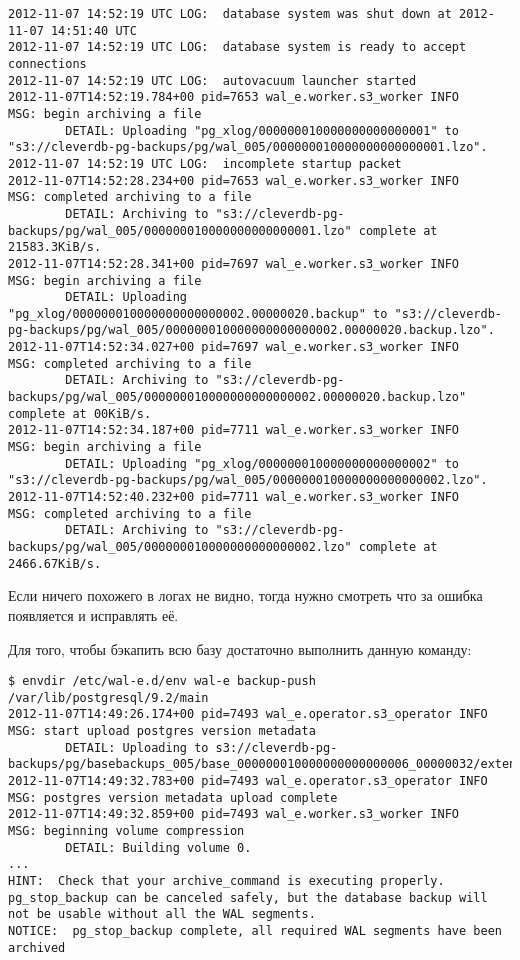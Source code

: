 \begin{lstlisting}[label=lst:wal-e8,caption=Логи PostgreSQL]
2012-11-07 14:52:19 UTC LOG:  database system was shut down at 2012-11-07 14:51:40 UTC
2012-11-07 14:52:19 UTC LOG:  database system is ready to accept connections
2012-11-07 14:52:19 UTC LOG:  autovacuum launcher started
2012-11-07T14:52:19.784+00 pid=7653 wal_e.worker.s3_worker INFO     MSG: begin archiving a file
        DETAIL: Uploading "pg_xlog/000000010000000000000001" to "s3://cleverdb-pg-backups/pg/wal_005/000000010000000000000001.lzo".
2012-11-07 14:52:19 UTC LOG:  incomplete startup packet
2012-11-07T14:52:28.234+00 pid=7653 wal_e.worker.s3_worker INFO     MSG: completed archiving to a file
        DETAIL: Archiving to "s3://cleverdb-pg-backups/pg/wal_005/000000010000000000000001.lzo" complete at 21583.3KiB/s.
2012-11-07T14:52:28.341+00 pid=7697 wal_e.worker.s3_worker INFO     MSG: begin archiving a file
        DETAIL: Uploading "pg_xlog/000000010000000000000002.00000020.backup" to "s3://cleverdb-pg-backups/pg/wal_005/000000010000000000000002.00000020.backup.lzo".
2012-11-07T14:52:34.027+00 pid=7697 wal_e.worker.s3_worker INFO     MSG: completed archiving to a file
        DETAIL: Archiving to "s3://cleverdb-pg-backups/pg/wal_005/000000010000000000000002.00000020.backup.lzo" complete at 00KiB/s.
2012-11-07T14:52:34.187+00 pid=7711 wal_e.worker.s3_worker INFO     MSG: begin archiving a file
        DETAIL: Uploading "pg_xlog/000000010000000000000002" to "s3://cleverdb-pg-backups/pg/wal_005/000000010000000000000002.lzo".
2012-11-07T14:52:40.232+00 pid=7711 wal_e.worker.s3_worker INFO     MSG: completed archiving to a file
        DETAIL: Archiving to "s3://cleverdb-pg-backups/pg/wal_005/000000010000000000000002.lzo" complete at 2466.67KiB/s.
\end{lstlisting}

Если ничего похожего в логах не видно, тогда нужно смотреть что за ошибка появляется и исправлять её.

Для того, чтобы бэкапить всю базу достаточно выполнить данную команду:

\begin{lstlisting}[label=lst:wal-e9,caption=Загрузка бэкапа всей базы данных в S3]
$ envdir /etc/wal-e.d/env wal-e backup-push /var/lib/postgresql/9.2/main
2012-11-07T14:49:26.174+00 pid=7493 wal_e.operator.s3_operator INFO     MSG: start upload postgres version metadata
        DETAIL: Uploading to s3://cleverdb-pg-backups/pg/basebackups_005/base_000000010000000000000006_00000032/extended_version.txt.
2012-11-07T14:49:32.783+00 pid=7493 wal_e.operator.s3_operator INFO     MSG: postgres version metadata upload complete
2012-11-07T14:49:32.859+00 pid=7493 wal_e.worker.s3_worker INFO     MSG: beginning volume compression
        DETAIL: Building volume 0.
...
HINT:  Check that your archive_command is executing properly.  pg_stop_backup can be canceled safely, but the database backup will not be usable without all the WAL segments.
NOTICE:  pg_stop_backup complete, all required WAL segments have been archived
\end{lstlisting}

